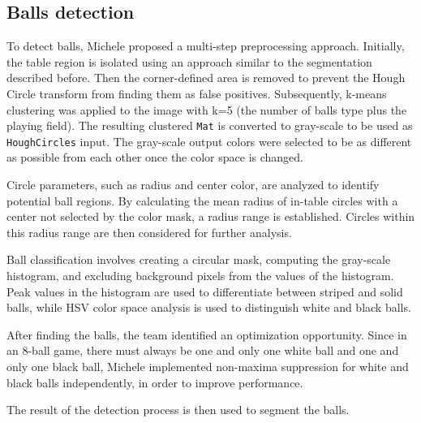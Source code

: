 \subsection{Balls detection}
To detect balls, Michele proposed a multi-step preprocessing approach. Initially, the table region is isolated using an approach similar to the segmentation described before. Then the corner-defined area is removed to prevent the Hough Circle transform from finding them as false positives. Subsequently, k-means clustering was applied to the image with k=5 (the number of balls type plus the playing field). The resulting clustered \texttt{Mat} is converted to gray-scale to be used as \texttt{HoughCircles} input. The gray-scale output colors were selected to be as different as possible from each other once the color space is changed.

Circle parameters, such as radius and center color, are analyzed to identify potential ball regions. By calculating the mean radius of in-table circles with a center not selected by the color mask, a radius range is established. Circles within this radius range are then considered for further analysis.

Ball classification involves creating a circular mask, computing the gray-scale histogram, and excluding background pixels from the values of the histogram. Peak values in the histogram are used to differentiate between striped and solid balls, while HSV color space analysis is used to distinguish white and black balls.

After finding the balls, the team identified an optimization opportunity. Since in an 8-ball game, there must always be one and only one white ball and one and only one black ball, Michele implemented non-maxima suppression for white and black balls independently, in order to improve performance.

The result of the detection process is then used to segment the balls.
